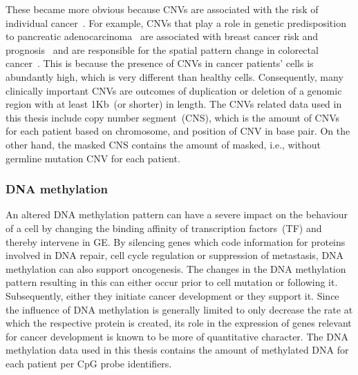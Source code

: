 \hspace*{3.5mm} These became more obvious because CNVs are associated with the risk of individual cancer~\cite{cnv11,cnv12,cnv13}. For example, CNVs that play a role in genetic predisposition to pancreatic adenocarcinoma~\cite{cnv13} are associated with breast cancer risk and prognosis~\cite{cnv12} and are responsible for the spatial pattern change in colorectal cancer~\cite{cnv11}. This is because the presence of CNVs in cancer patients’ cells is abundantly high, which is very different than healthy cells. Consequently, many clinically important CNVs are outcomes of duplication or deletion of a genomic region with at least 1Kb~(or shorter) in length. The CNVs related data used in this thesis include copy number segment~(CNS), which is the amount of CNVs for each patient based on chromosome, and position of CNV in base pair. On the other hand, the masked CNS contains the amount of masked, i.e., without germline mutation CNV for each patient.

\subsubsection{DNA methylation}
An altered DNA methylation pattern can have a severe impact on the behaviour of a cell by changing the binding affinity of transcription factors~(TF) and thereby intervene in GE. By silencing genes which code information for proteins involved in DNA repair, cell cycle regulation or suppression of metastasis, DNA methylation can also support oncogenesis. The changes in the DNA methylation pattern resulting in this can either occur prior to cell mutation or following it. Subsequently, either they initiate cancer development or they support it. Since the influence of DNA methylation is generally limited to only decrease the rate at which the respective protein is created, its role in the expression of genes relevant for cancer development is known to be more of quantitative character. The DNA methylation data used in this thesis contains the amount of methylated DNA for each patient per CpG probe identifiers. 


